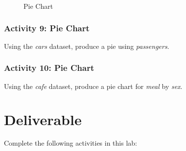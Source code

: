 \begin{figure}[H]
  \begin{center}
    \caption{Pie Chart}
    \label{lab02_fig22}
  \end{center}
\end{figure}

\subsubsection{Activity 9: Pie Chart} \label{lab02_act09}

Using the \textit{cars} dataset, produce a pie using \textit{passengers}.

\subsubsection{Activity 10: Pie Chart} \label{lab02_act10}

Using the \textit{cafe} dataset, produce a pie chart for \textit{meal} by \textit{sex}.

\section{Deliverable}

Complete the following activities in this lab:

